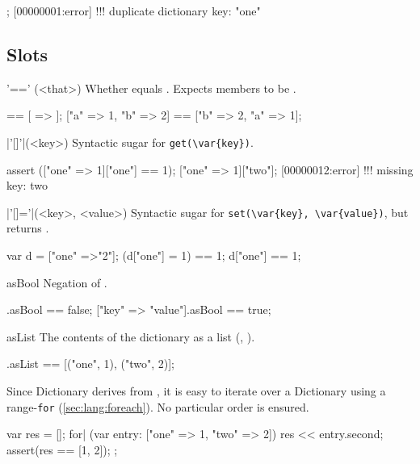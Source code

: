 \begin{urbiscript}
["one" => 1, "one" => 2];
[00000001:error] !!! duplicate dictionary key: "one"
\end{urbiscript}


\subsection{Slots}

\begin{urbiscriptapi}
\item['=='](<that>)%
  Whether \this equals .  Expects members to be
  .
\begin{urbiassert}
[ => ] == [ => ];
["a" => 1, "b" => 2] == ["b" => 2, "a" => 1];
\end{urbiassert}


\item|'[]'|(<key>)%
  Syntactic sugar for \lstinline|get(\var{key})|.

\begin{urbiscript}
assert (["one" => 1]["one"] == 1);
["one" => 1]["two"];
[00000012:error] !!! missing key: two
\end{urbiscript}


\item|'[]='|(<key>, <value>)%
  Syntactic sugar for \lstinline|set(\var{key}, \var{value})|, but returns
  .

\begin{urbiassert}
var d = ["one" =>"2"];
(d["one"] = 1) == 1;
d["one"] == 1;
\end{urbiassert}


\item[asBool]
  Negation of .
\begin{urbiassert}
[=>].asBool == false;
["key" => "value"].asBool == true;
\end{urbiassert}


\item[asList]%
  The contents of the dictionary as a  list (,
  ).

\begin{urbiassert}
["one" => 1, "two" => 2].asList == [("one", 1), ("two", 2)];
\end{urbiassert}

  \noindent
  Since Dictionary derives from , it is easy to
  iterate over a Dictionary using a range-\lstinline|for|
  (\autoref{sec:lang:foreach}).  No particular order is ensured.
\begin{urbiscript}
{
  var res = [];
  for| (var entry: ["one" => 1, "two" => 2])
    res << entry.second;
  assert(res == [1, 2]);
};
\end{urbiscript}



\end{urbiscriptapi}
